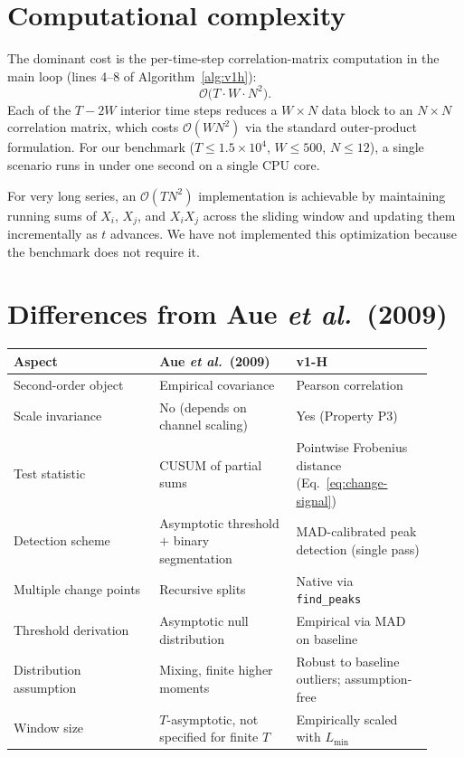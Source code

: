 \documentclass[11pt,a4paper]{article}
\begin{document}
\section{Computational complexity}

The dominant cost is the per-time-step correlation-matrix computation in
the main loop (lines 4--8 of Algorithm~\ref{alg:v1h}):
\begin{equation}
\mathcal{O}\big(T \cdot W \cdot N^2\big).
\end{equation}
Each of the $T - 2W$ interior time steps reduces a $W \times N$ data block
to an $N \times N$ correlation matrix, which costs $\mathcal{O}(W N^2)$ via
the standard outer-product formulation. For our benchmark
($T \le 1.5 \times 10^4$, $W \le 500$, $N \le 12$), a single scenario runs
in under one second on a single CPU core.

For very long series, an $\mathcal{O}(T N^2)$ implementation is achievable
by maintaining running sums of $X_i$, $X_j$, and $X_i X_j$ across the
sliding window and updating them incrementally as $t$ advances. We have
not implemented this optimization because the benchmark does not require it.

\section{Differences from Aue \emph{et al.}\ (2009)}

\begin{table}[ht]
\centering
\small
\begin{tabular}{p{0.32\linewidth} p{0.30\linewidth} p{0.30\linewidth}}
\toprule
\textbf{Aspect} & \textbf{Aue \emph{et al.}\ (2009)} & \textbf{v1-H} \\
\midrule
Second-order object &
  Empirical covariance &
  Pearson correlation \\
Scale invariance &
  No (depends on channel scaling) &
  Yes (Property P3) \\
Test statistic &
  CUSUM of partial sums &
  Pointwise Frobenius distance (Eq.~\ref{eq:change-signal}) \\
Detection scheme &
  Asymptotic threshold $+$ binary segmentation &
  MAD-calibrated peak detection (single pass) \\
Multiple change points &
  Recursive splits &
  Native via \texttt{find\_peaks} \\
Threshold derivation &
  Asymptotic null distribution &
  Empirical via MAD on baseline \\
Distribution assumption &
  Mixing, finite higher moments &
  Robust to baseline outliers; assumption-free \\
Window size &
  $T$-asymptotic, not specified for finite $T$ &
  Empirically scaled with $L_{\min}$ \\
\bottomrule
\end{tabular}
\end{table}
\end{document}
